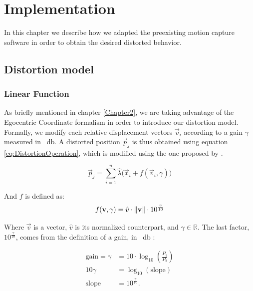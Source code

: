 
\chapter{Implementation} %

\label{Chapter3} %

In this chapter we describe how we adapted the preexisting motion capture software in order to obtain the desired distorted behavior.

\section{Distortion model}


\subsection*{Linear Function}

As briefly mentioned in chapter \ref{Chapter2}, we are taking advantage of the Egocentric Coordinate formalism in order to introduce our distortion model. Formally, we modify each relative displacement vectors $\vec{v}_i$ according to a gain $\gamma$ measured in \SI{}{\decibel}. A distorted position $\vec{p}_j$ is thus obtained using equation \ref{eq:DistortionOperation}, which is modified using the one proposed by \cite{molla2017egocentric}.

\begin{equation}
\label{eq:DistortionOperation}
\vec{p}_j = \displaystyle\sum_{i=1}^{n} \hat{\lambda}\big(\vec{x}_i + f(\vec{v}_i,\gamma )\big)
\end{equation}

\noindent
And $f$ is defined as:
\begin{equation}
\label{eq:DistortionFunction}
f(\mathbf{v},\gamma ) = \hat{v} \cdot \lVert\mathbf{v}\rVert \cdot 10^{\frac{\gamma}{10}}
\end{equation}

\noindent
Where $\vec{v}$ is a vector, $\hat{v}$ is its normalized counterpart, and $\gamma \in \mathbb{R}$. The last factor, $10^{\frac{\gamma}{10}}$, comes from the definition of a gain, in \SI{}{\decibel} \cite{book:decibel}:

\begin{align*}
    \text{gain} = \gamma &= 10 \cdot \log_{10} (\frac{P_1}{P_2})\\
    10\gamma &= \log_{10} (\text{slope})\\
    \text{slope} &= 10^{\frac{\gamma}{10}}.
\end{align*}

